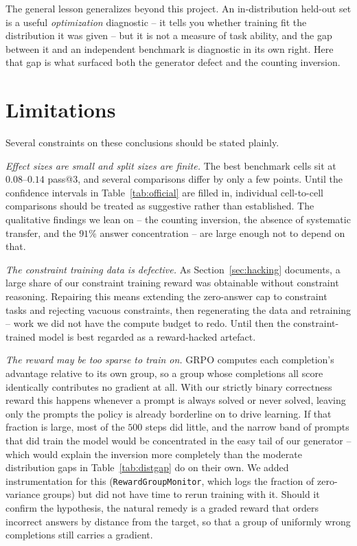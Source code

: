 \documentclass[a4paper,oneside,10pt,ngerman,english]{scrartcl}
\begin{document}
The general lesson generalizes beyond this project. An in-distribution held-out
set is a useful \emph{optimization} diagnostic -- it tells you whether training
fit the distribution it was given -- but it is not a measure of task ability, and
the gap between it and an independent benchmark is diagnostic in its own right.
Here that gap is what surfaced both the generator defect and the counting
inversion.

\section{Limitations}
\label{sec:limitations}

Several constraints on these conclusions should be stated plainly.

\emph{Effect sizes are small and split sizes are finite.} The best benchmark
cells sit at $0.08$--$0.14$ pass@3, and several comparisons differ by only a few
points. Until the confidence intervals in Table~\ref{tab:official} are filled
in, individual cell-to-cell comparisons should be treated as suggestive rather
than established. The qualitative findings we lean on -- the counting inversion,
the absence of systematic transfer, and the $91\%$ answer concentration -- are
large enough not to depend on that.

\emph{The constraint training data is defective.} As
Section~\ref{sec:hacking} documents, a large share of our constraint training
reward was obtainable without constraint reasoning. Repairing this means
extending the zero-answer cap to constraint tasks and rejecting vacuous
constraints, then regenerating the data and retraining -- work we did not have
the compute budget to redo. Until then the constraint-trained model is best
regarded as a reward-hacked artefact.

\emph{The reward may be too sparse to train on.} GRPO computes each completion's
advantage relative to its own group, so a group whose completions all score
identically contributes no gradient at all. With our strictly binary correctness
reward this happens whenever a prompt is always solved or never solved, leaving
only the prompts the policy is already borderline on to drive learning. If that
fraction is large, most of the $500$ steps did little, and the narrow band of
prompts that did train the model would be concentrated in the easy tail of our
generator -- which would explain the inversion more completely than the moderate
distribution gaps in Table~\ref{tab:distgap} do on their own. We added
instrumentation for this (\texttt{RewardGroupMonitor}, which logs the fraction of
zero-variance groups) but did not have time to rerun training with it. Should it
confirm the hypothesis, the natural remedy is a graded reward that orders
incorrect answers by distance from the target, so that a group of uniformly
wrong completions still carries a gradient.
\end{document}
